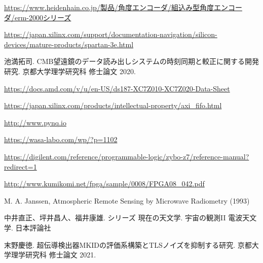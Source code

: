 \begin{thebibliography}{99}
\href{https://www.heidenhain.co.jp/製品/角度エンコーダ/組込み型角度エンコーダ/erm-2000シリーズ}{https://www.heidenhain.co.jp/製品/角度エンコーダ/組込み型角度エンコーダ/erm-2000シリーズ}

\href{https://japan.xilinx.com/support/documentation-navigation/silicon-devices/mature-products/spartan-3e.html}{
https://japan.xilinx.com/support/documentation-navigation/silicon-devices/mature-products/spartan-3e.html}

池満拓司. CMB望遠鏡のデータ読み出しシステムの時刻同期と較正に関する開発研究. 京都大学理学研究科 修士論文 2020.

\href{https://docs.amd.com/v/u/en-US/ds187-XC7Z010-XC7Z020-Data-Sheet}{https://docs.amd.com/v/u/en-US/ds187-XC7Z010-XC7Z020-Data-Sheet}

\href{https://japan.xilinx.com/products/intellectual-property/axi\_fifo.html}{https://japan.xilinx.com/products/intellectual-property/axi\_fifo.html}

\href{http://www.pynq.io}{http://www.pynq.io}

\href{https://wasa-labo.com/wp/?p=1102}{https://wasa-labo.com/wp/?p=1102}

\href{https://digilent.com/reference/programmable-logic/zybo-z7/reference-manual?redirect=1}{https://digilent.com/reference/programmable-logic/zybo-z7/reference-manual?redirect=1}


\href{http://www.kumikomi.net/fpga/sample/0008/FPGA08\_042.pdf}{http://www.kumikomi.net/fpga/sample/0008/FPGA08\_042.pdf}


M. A. Janssen, Atmospheric Remote Sensing by Microwave Radiometry (1993)

中井直正、坪井昌人、福井康雄. シリーズ  現在の天文学. 宇宙の観測I\hspace{-1.2pt}I  電波天文学. 日本評論社

末野慶徳. 超伝導検出器MKIDの評価系構築とTLSノイズを抑制する研究. 京都大学理学研究科 修士論文 2021.


\end{thebibliography}
